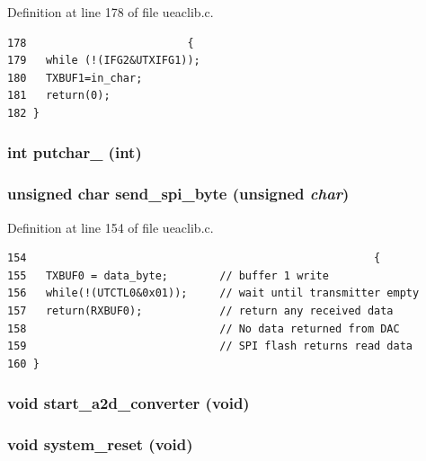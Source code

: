 Definition at line 178 of file ueaclib.c.

\footnotesize\begin{verbatim}178                         {
179   while (!(IFG2&UTXIFG1));
180   TXBUF1=in_char;
181   return(0);
182 }
\end{verbatim}\normalsize 


\subsubsection{\setlength{\rightskip}{0pt plus 5cm}int putchar\_ (int)}\label{ueaclib_8h_a7}


\subsubsection{\setlength{\rightskip}{0pt plus 5cm}unsigned char send\_\-spi\_\-byte (unsigned {\em char})}\label{ueaclib_8h_a11}




Definition at line 154 of file ueaclib.c.

\footnotesize\begin{verbatim}154                                                      {
155   TXBUF0 = data_byte;        // buffer 1 write  
156   while(!(UTCTL0&0x01));     // wait until transmitter empty
157   return(RXBUF0);            // return any received data
158                              // No data returned from DAC
159                              // SPI flash returns read data
160 }
\end{verbatim}\normalsize 


\subsubsection{\setlength{\rightskip}{0pt plus 5cm}void start\_\-a2d\_\-converter (void)}\label{ueaclib_8h_a16}


\subsubsection{\setlength{\rightskip}{0pt plus 5cm}void system\_\-reset (void)}\label{ueaclib_8h_a19}


